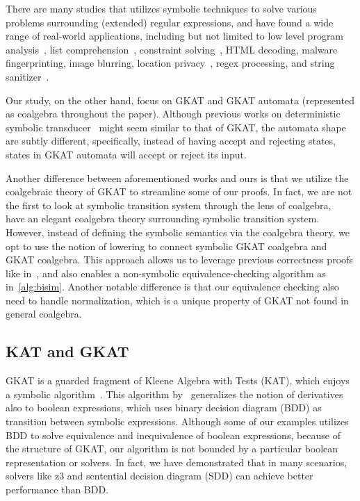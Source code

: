 \documentclass[conference]{IEEEtran}
\begin{document}
There are many studies that utilizes symbolic techniques to solve various problems surrounding (extended) regular expressions, and have found a wide range of real-world applications, including but not limited to low level program analysis~\cite{dallapreda_AbstractSymbolicAutomata_2015a}, list comprehension~\cite{saarikivi_FusingEffectfulComprehensions_2017}, constraint solving~\cite{stanford_SymbolicBooleanDerivatives_2021}, HTML decoding, malware fingerprinting, image blurring, location privacy~\cite{veanes_SymbolicFiniteState_2012}, regex processing, and string sanitizer~\cite{veanes_ApplicationsSymbolicFinite_2013}.

Our study, on the other hand,  focus on GKAT and GKAT automata (represented as coalgebra throughout the paper). 
Although previous works on deterministic symbolic transducer~\cite{saarikivi_FusingEffectfulComprehensions_2017,veanes_SymbolicFiniteState_2012} might seem similar to that of GKAT, the automata shape are subtly different, specifically, instead of having accept and rejecting states, states in GKAT automata will accept or reject its input.

Another difference between aforementioned works and ours is that we utilize the coalgebraic theory of GKAT to streamline some of our proofs.
In fact, we are not the first to look at symbolic transition system through the lens of coalgebra, \citeauthor{bonchi_CoalgebraicSymbolicSemantics_2009}~\cite{bonchi_CoalgebraicSymbolicSemantics_2009} have an elegant coalgebra theory surrounding symbolic transition system.
However, instead of defining the symbolic semantics via the coalgebra theory, we opt to use the notion of lowering to connect symbolic GKAT coalgebra and GKAT coalgebra.
This approach allows us to leverage previous correctness proofs like in~, and also enables a non-symbolic equivalence-checking algorithm as in~\cref{alg:bisim}.
Another notable difference is that our equivalence checking also need to handle normalization, which is a unique property of GKAT not found in general coalgebra.

\subsection{KAT and GKAT}

GKAT is a guarded fragment of Kleene Algebra with Tests (KAT), which enjoys a symbolic algorithm~\cite{pous_SymbolicAlgorithmsLanguage_2015}.
This algorithm by~\citeauthor{pous_SymbolicAlgorithmsLanguage_2015} generalizes the notion of derivatives also to boolean expressions, which uses binary decision diagram (BDD) as transition between symbolic expressions.
Although some of our examples utilizes BDD to solve equivalence and inequivalence of boolean expressions, because of the structure of GKAT, our algorithm is not bounded by a particular boolean representation or solvers.
In fact, we have demonstrated that in many scenarios, solvers like z3 and sentential decision diagram (SDD) can achieve better performance than BDD.
\end{document}
